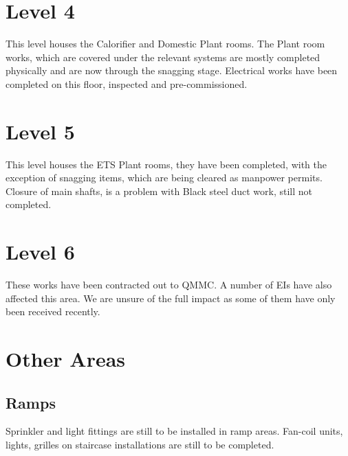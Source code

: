 \section{Level 4}

This level houses the Calorifier and Domestic Plant rooms. The Plant room works, which are covered under the relevant systems are mostly completed physically and are now through the snagging stage. Electrical works have been completed on this floor, inspected and pre-commissioned.

\section{Level 5}

This level houses the ETS Plant rooms, they have been completed, with the exception of snagging items, which are being cleared as manpower permits. Closure of main shafts, is a problem with Black steel duct work, still not completed.

\section{Level 6}

These works have been contracted out to QMMC. A number of EIs have also affected this area. We are unsure of the full impact as some of them have only been received recently. 

\section{Other Areas}

\subsection{Ramps}

Sprinkler and light fittings are still to be installed in ramp areas. Fan-coil units, lights, grilles on staircase installations are still to be completed.







